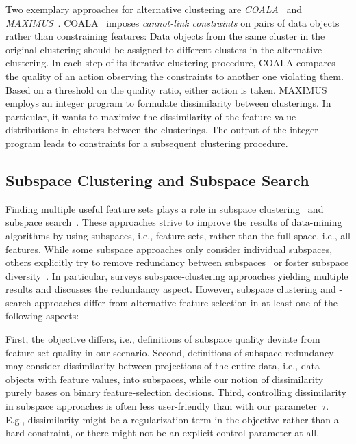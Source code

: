 \documentclass{article}
\theoremstyle{definition}
\begin{document}
Two exemplary approaches for alternative clustering are \emph{COALA}~\cite{bae2006coala} and \emph{MAXIMUS}~\cite{bae2010clustering}.
COALA~\cite{bae2006coala} imposes \emph{cannot-link constraints} on pairs of data objects rather than constraining features:
Data objects from the same cluster in the original clustering should be assigned to different clusters in the alternative clustering.
In each step of its iterative clustering procedure, COALA compares the quality of an action observing the constraints to another one violating them.
Based on a threshold on the quality ratio, either action is taken.
MAXIMUS~\cite{bae2010clustering} employs an integer program to formulate dissimilarity between clusterings.
In particular, it wants to maximize the dissimilarity of the feature-value distributions in clusters between the clusterings.
The output of the integer program leads to constraints for a subsequent clustering procedure.

\subsection{Subspace Clustering and Subspace Search}
\label{sec:afs:related-work:subspace}

Finding multiple useful feature sets plays a role in subspace clustering~\cite{gunnemann2009detection, hu2018subspace, mueller2009relevant} and subspace search~\cite{fouche2021efficient, nguyen20134s, trittenbach2019dimension}.
These approaches strive to improve the results of data-mining algorithms by using subspaces, i.e., feature sets, rather than the full space, i.e., all features.
While some subspace approaches only consider individual subspaces, others explicitly try to remove redundancy between subspaces~\cite{gunnemann2009detection, hu2018subspace, nguyen20134s} or foster subspace diversity~\cite{fouche2021efficient, trittenbach2019dimension}.
In particular, \cite{hu2018subspace} surveys subspace-clustering approaches yielding multiple results and discusses the redundancy aspect.
However, subspace clustering and -search approaches differ from alternative feature selection in at least one of the following aspects:

First, the objective differs, i.e., definitions of subspace quality deviate from feature-set quality in our scenario.
Second, definitions of subspace redundancy may consider dissimilarity between projections of the entire data, i.e., data objects with feature values, into subspaces, while our notion of dissimilarity purely bases on binary feature-selection decisions.
Third, controlling dissimilarity in subspace approaches is often less user-friendly than with our parameter~$\tau$.
E.g., dissimilarity might be a regularization term in the objective rather than a hard constraint, or there might not be an explicit control parameter at all.
\end{document}
